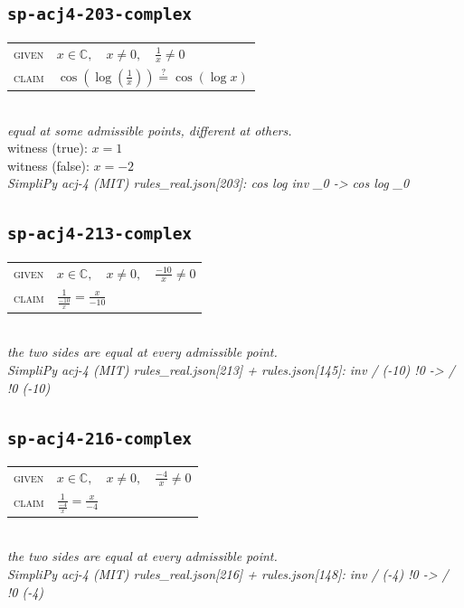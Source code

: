 \documentclass[11pt]{article}
\begin{document}
\subsection*{\texttt{sp-acj4-203-complex}}
\begin{tabular}{@{}l@{\quad}l@{}}
\textsc{given} & $x \in \mathbb{C},\quad x \neq 0,\quad \frac{1}{x} \neq 0$ \\[4pt]
\textsc{claim} & $\displaystyle \cos\left(\log\left(\frac{1}{x}\right)\right) \overset{?}{=} \cos\left(\log x\right)$ \\
\end{tabular}\\[2pt]
{\small\emph{equal at some admissible points, different at others.}}\\
{\footnotesize\color{gray}witness (true): $x = 1$}\\
{\footnotesize\color{gray}witness (false): $x = -2$}\\
\emph{SimpliPy acj-4 (MIT) rules\_real.json[203]: cos log inv \_0  ->  cos log \_0}\\

\subsection*{\texttt{sp-acj4-213-complex}}
\begin{tabular}{@{}l@{\quad}l@{}}
\textsc{given} & $x \in \mathbb{C},\quad x \neq 0,\quad \frac{-10}{x} \neq 0$ \\[4pt]
\textsc{claim} & $\displaystyle \frac{1}{\frac{-10}{x}} = \frac{x}{-10}$ \\
\end{tabular}\\[2pt]
{\small\emph{the two sides are equal at every admissible point.}}\\
\emph{SimpliPy acj-4 (MIT) rules\_real.json[213] + rules.json[145]: inv / (-10) !0  ->  / !0 (-10)}\\

\subsection*{\texttt{sp-acj4-216-complex}}
\begin{tabular}{@{}l@{\quad}l@{}}
\textsc{given} & $x \in \mathbb{C},\quad x \neq 0,\quad \frac{-4}{x} \neq 0$ \\[4pt]
\textsc{claim} & $\displaystyle \frac{1}{\frac{-4}{x}} = \frac{x}{-4}$ \\
\end{tabular}\\[2pt]
{\small\emph{the two sides are equal at every admissible point.}}\\
\emph{SimpliPy acj-4 (MIT) rules\_real.json[216] + rules.json[148]: inv / (-4) !0  ->  / !0 (-4)}\\
\end{document}
